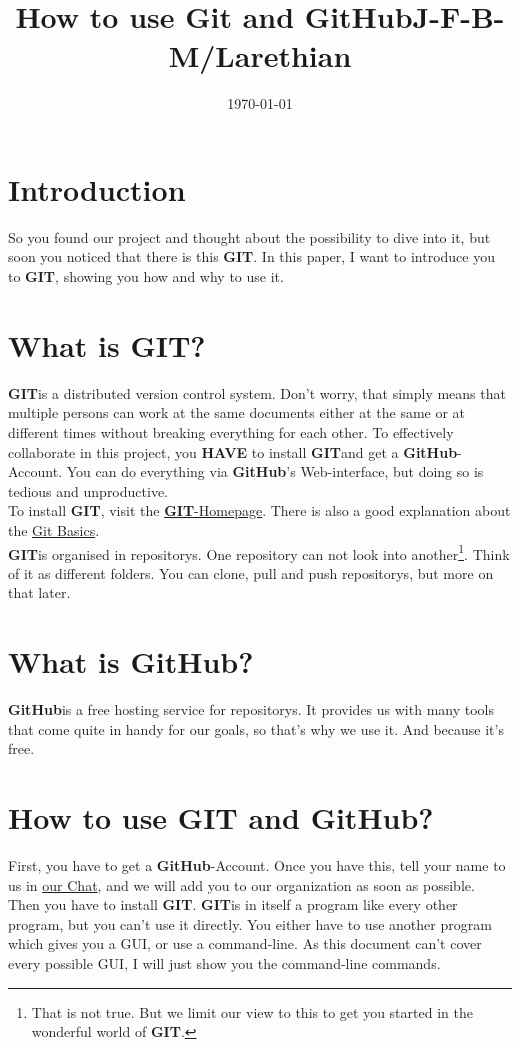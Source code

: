 \documentclass[a4paper]{article}
\title{How to use Git and GitHub}
\title{J-F-B-M/Larethian}
\date{\today}
\newcommand{\git}{\textbf{GIT}}
\newcommand{\github}{\textbf{GitHub}}
\newcommand{\chatlink}{http://chat.stackexchange.com/rooms/17796/collaborative-shared-worlds}
\begin{document}
\maketitle

\section{Introduction}

So you found our project and thought about the possibility to dive into it, but soon you noticed that there is this \git. In this paper, I want to introduce you to \git, showing you how and why to use it.

\section{What is GIT?}

\git is a distributed version control system. Don't worry, that simply means that multiple persons can work at the same documents either at the same or at different times without breaking everything for each other. To effectively collaborate in this project, you \textbf{HAVE} to install \git and get a \github -Account. You can do everything via \github's Web-interface, but doing so is tedious and unproductive.\\
To install \git, visit the \href{http://git-scm.com/}{\git -Homepage}. There is also a good explanation about the \href{http://git-scm.com/book/en/v2/Getting-Started-Git-Basics}{Git Basics}.\\
\git is organised in repositorys. One repository can not look into another\footnote{That is not true. But we limit our view to this to get you started in the wonderful world of \git.}. Think of it as different folders. You can clone, pull and push repositorys, but more on that later.

\section{What is GitHub?}

\github is a free hosting service for repositorys. It provides us with many tools that come quite in handy for our goals, so that's why we use it. And because it's free.

\section{How to use GIT and GitHub?}

First, you have to get a \github -Account. Once you have this, tell your name to us in \href{\chatlink}{our Chat}, and we will add you to our organization as soon as possible.\\
Then you have to install \git . \git is in itself a program like every other program, but you can't use it directly. You either have to use another program which gives you a GUI, or use a command-line. As this document can't cover every possible GUI, I will just show you the command-line commands.
\end{document}
